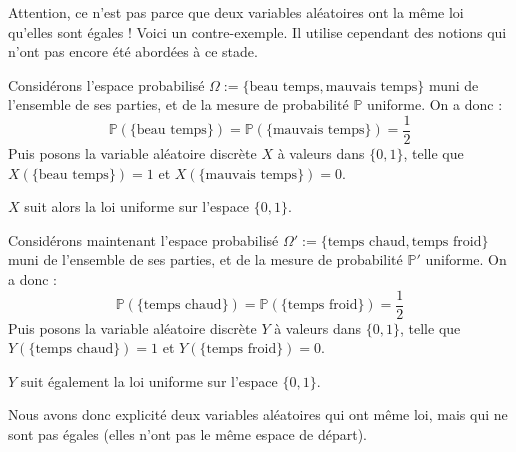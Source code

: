 \documentclass[../integ-proba.tex]{subfiles}
\begin{document}
\begin{rem}
    Attention, ce n'est pas parce que deux variables aléatoires ont la même loi qu'elles sont égales !
    Voici un contre-exemple. Il utilise cependant des notions qui n'ont pas encore été abordées à ce stade.
    
    Considérons l'espace probabilisé $\Omega := \{\text{beau temps}, \text{mauvais temps}\}$ muni de l'ensemble de ses parties, et de la mesure de probabilité $\mathbb{P}$ uniforme.
    On a donc :
    $$
    \mathbb{P}(\{\text{beau temps}\}) = \mathbb{P}(\{\text{mauvais temps}\}) = \frac{1}{2}
    $$
    Puis posons la variable aléatoire discrète $X$ à valeurs dans $\{0,1\}$, telle que $X(\{\text{beau temps}\})=1$ et $X(\{\text{mauvais temps}\})=0$.
    
    $X$ suit alors la loi uniforme sur l'espace $\{0,1\}$.

    Considérons maintenant l'espace probabilisé $\Omega' := \{\text{temps chaud}, \text{temps froid}\}$ muni de l'ensemble de ses parties, et de la mesure de probabilité $\mathbb{P}'$ uniforme.
    On a donc :
    $$
    \mathbb{P}(\{\text{temps chaud}\}) = \mathbb{P}(\{\text{temps froid}\}) = \frac{1}{2}
    $$
    Puis posons la variable aléatoire discrète $Y$ à valeurs dans $\{0,1\}$, telle que $Y(\{\text{temps chaud}\})=1$ et $Y(\{\text{temps froid}\})=0$.

    $Y$ suit également la loi uniforme sur l'espace $\{0,1\}$.

    Nous avons donc explicité deux variables aléatoires qui ont même loi, mais qui ne sont pas égales (elles n'ont pas le même espace de départ).
\end{rem}
\end{document}
